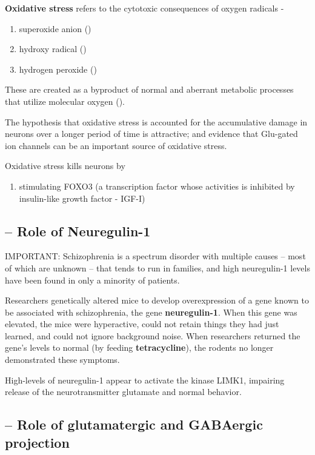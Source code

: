 {\bf Oxidative stress} refers to the cytotoxic consequences of oxygen radicals - 
\begin{enumerate}
  \item superoxide anion ()
  
  \item hydroxy radical ()
  
  \item hydrogen peroxide ()
\end{enumerate}
These are created as a byproduct of normal and aberrant metabolic processes that
utilize molecular oxygen ().

The hypothesis that oxidative stress is accounted for the accumulative damage in
neurons over a longer period of time is attractive; and evidence that Glu-gated
ion channels can be an important source of oxidative stress.

 Oxidative stress kills neurons by
\begin{enumerate}
  \item stimulating FOXO3 (a transcription factor whose activities is inhibited
  by insulin-like growth factor - IGF-I)
\end{enumerate}




\subsection{ -- Role of Neuregulin-1}

IMPORTANT: Schizophrenia is a spectrum disorder with multiple causes -- most of
which are unknown -- that tends to run in families, and high neuregulin-1 levels
have been found in only a minority of patients.

Researchers genetically altered mice to develop overexpression of a gene known
to be associated with schizophrenia, the gene {\bf neuregulin-1}. When this gene
was elevated, the mice were hyperactive, could not retain things they had just
learned, and could not ignore background noise. When researchers returned the
gene's levels to normal (by feeding {\bf tetracycline}), the rodents no longer
demonstrated these symptoms.


High-levels of neuregulin-1 appear to activate the kinase LIMK1, impairing
release of the neurotransmitter glutamate and normal behavior. 


\subsection{ -- Role of glutamatergic and GABAergic projection}
\label{sec:schizophrenia-hypothesis-glutamate-role}

